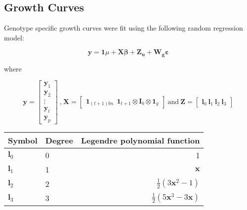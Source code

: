 \documentclass[12pt, letterpaper]{article}
\begin{document}






\subsection{Growth Curves}

Genotype specific growth curves were fit using the following random regression model:


\begin{equation} \label{eq:G}
	 \mathbf{y} = \mathbf{1} \mu + \mathbf{X} \boldsymbol{\beta} + \mathbf{Z}_\mathbf{u} + \mathbf{W}_\mathbf{g} \boldsymbol\varepsilon 
\end{equation}

where 

\begin{equation}
 \mathbf{y} = \begin{bmatrix}
    \mathbf{y}_1 \\
    \mathbf{y}_2 \\
    \vdots \\
    \mathbf{y}_t \\
    \mathbf{y}_p
  \end{bmatrix} \ \text{,} \  \mathbf{X} = \begin{bmatrix}
    \mathbf{1}_{(t+1)bn} \ \ \mathbf{1}_{t+1} \otimes \mathbf{I}_{b} \otimes \mathbf{1}_{g}
  \end{bmatrix} \ \text{and} \  \mathbf{Z} = \begin{bmatrix}
    \mathbf{l}_0 \ \mathbf{l}_1 \ \mathbf{l}_2 \ \mathbf{l}_3
  \end{bmatrix}
\end{equation}


\begin{table}
\label{legfunc}
\begin{tabular}{llr}
	 Symbol & Degree & Legendre polynomial function \\ 
	 \hline
	 $\mathbf{l}_0$ & 0 & 1 \\
	 $\mathbf{l}_1$ & 1 & $\mathbf{x}$ \\
	 $\mathbf{l}_2$ & 2 & $\frac{1}{2}(3\mathbf{x}^2 - 1)$ \\
	 $\mathbf{l}_3$ & 3 & $\frac{1}{2}(5\mathbf{x}^3 - 3\mathbf{x})$ \\
	 \hline
\end{tabular}
\end{table}
\end{document}
